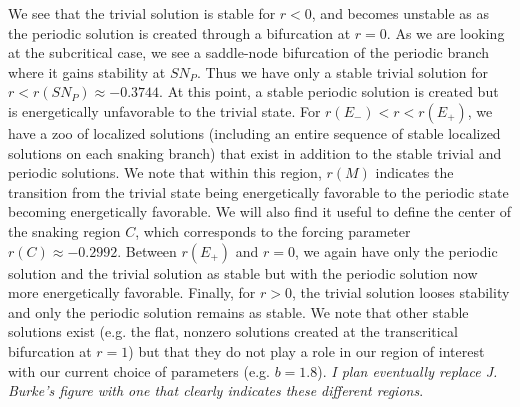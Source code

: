 \documentclass[pre,preprint,superscriptaddress]{revtex4-1}
\begin{document}
We see that the trivial solution is stable for $r<0$, and becomes unstable as as the periodic solution is created through a bifurcation at $r=0$.  As we are looking at the subcritical case, we see a saddle-node bifurcation of the periodic branch where it gains stability at $SN_P$.  Thus we have only a stable trivial solution for $r<r(SN_P)\approx -0.3744$. At this point, a stable periodic solution is created but is energetically unfavorable to the trivial state.  For $r(E_-)<r<r(E_+)$, we have a zoo of localized solutions (including an entire sequence of stable localized solutions on each snaking branch) that exist in addition to the stable trivial and periodic solutions.  We note that within this region, $r(M)$ indicates the transition from the trivial state being energetically favorable to the periodic state becoming energetically favorable.  We will also find it useful to define the center of the snaking region $C$, which corresponds to  the forcing parameter $r(C)\approx -0.2992$.  Between $r(E_+)$ and $r=0$, we again have only the periodic solution and the trivial solution as stable  but with the periodic solution now more energetically favorable.   Finally, for $r>0$, the trivial solution looses stability and only the periodic solution remains as stable.  We note that other stable solutions exist (e.g. the flat, nonzero solutions created at the transcritical bifurcation at $r=1$) but that they do not play a role in our region of interest with our current choice of parameters (e.g. $b=1.8$).  {\it I plan eventually replace J. Burke's figure with one that clearly indicates these different regions}.
\end{document}
